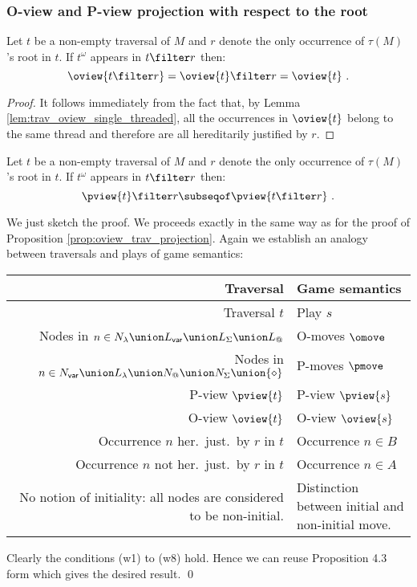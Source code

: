 \subsubsection{O-view and P-view projection with respect to the root}
\begin{lemma}
\label{lem:trav_projection} Let $t$ be a non-empty traversal of $M$
and $r$ denote the only occurrence of $\tau(M)$'s root in $t$. If
$t^\omega$ appears in $t\filter r$ then:
$$\oview{t\filter r} = \oview{t}\filter r = \oview{t} \ .$$
\end{lemma}
\begin{proof}
It follows immediately from the fact that, by Lemma \ref{lem:trav_oview_single_threaded}, all the occurrences in $\oview{t}$ belong to the same thread and therefore are all hereditarily justified by $r$.
\end{proof}

\begin{lemma}
\label{lem:trav_pview_red}
Let $t$ be a non-empty traversal of $M$ and $r$ denote the only occurrence of $\tau(M)$'s
root in $t$. If $t^\omega$ appears in $t\filter r$ then:
$$ \pview{t} \filter r \subseqof \pview{t \filter r} \  .$$
\end{lemma}
\proof We just sketch the proof. We proceeds exactly in the same way
as for the proof of Proposition \ref{prop:oview_trav_projection}.
Again we establish an analogy between traversals and plays of game
semantics:
\begin{center}
\begin{tabular}{r|p{5cm}}
{Traversal} & {Game semantics} \\
\hline
Traversal $t$ & Play $s$ \\
Nodes in $n \in N_\lambda \union L_{\sf var} \union L_\Sigma \union L_@$ & O-moves $\omove$ \\
Nodes in $n \in N_{\sf var} \union L_\lambda \union N_@ \union N_\Sigma \union \{\diamond\}$ & P-moves $\pmove$\\
P-view $\pview{t}$  & P-view $\pview{s}$\\
O-view $\oview{t}$  & O-view $\oview{s}$\\
Occurrence $n$ her.\ just.\ by $r$ in $t$ & Occurrence $n \in B$ \\
Occurrence $n$ not her.\ just.\ by $r$ in $t$ & Occurrence $n \in A$ \\
\parbox[t]{6cm}{\raggedleft No notion of initiality: all nodes are considered to be non-initial.} & Distinction between initial and non-initial move.
\end{tabular}
\end{center}
Clearly the conditions (w1) to (w8) hold. Hence we can reuse Proposition 4.3 form \cite{hylandong_pcf} which gives the desired result. \qed
\bigskip

